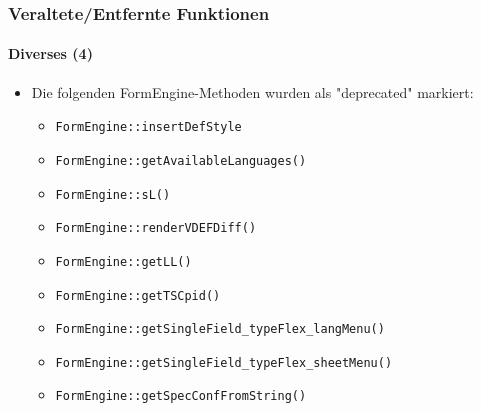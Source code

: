 \begin{frame}[fragile]
	\frametitle{Veraltete/Entfernte Funktionen}
	\framesubtitle{Diverses (4)}

	\begin{itemize}
		\item Die folgenden FormEngine-Methoden wurden als "deprecated" markiert:
		\begin{itemize}
			\item \texttt{FormEngine::insertDefStyle}
			\item \texttt{FormEngine::getAvailableLanguages()}
			\item \texttt{FormEngine::sL()}
			\item \texttt{FormEngine::renderVDEFDiff()}
			\item \texttt{FormEngine::getLL()}
 			\item \texttt{FormEngine::getTSCpid()}
 			\item \texttt{FormEngine::getSingleField\_typeFlex\_langMenu()}
 			\item \texttt{FormEngine::getSingleField\_typeFlex\_sheetMenu()}
 			\item \texttt{FormEngine::getSpecConfFromString()}
 		\end{itemize}
	\end{itemize}

\end{frame}

